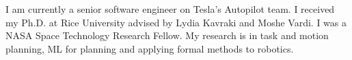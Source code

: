 
\small{I am currently a senior software engineer on Tesla's Autopilot team. I received my Ph.D. at Rice University advised by Lydia Kavraki and Moshe Vardi. I was a NASA Space Technology Research Fellow. My research is in task and motion planning, ML for planning and applying formal methods to robotics.}
